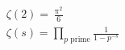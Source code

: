 \documentclass[nofonts]{ctexart}
\newenvironment{mysubeqn}%
{\begin{subequations}
	\renewcommand\theequation{\theparentequation-\roman{equation}}}%
{\end{subequations}}
\begin{document}
\begin{mysubeqn}
	\begin{gather}
		\zeta(2) = \frac{\uppi^2}{6} \\
		\zeta(s) = \prod_{p\text{ prime}} \frac{1}{1 - p^{-s}}
	\end{gather}
\end{mysubeqn}
\end{document}
